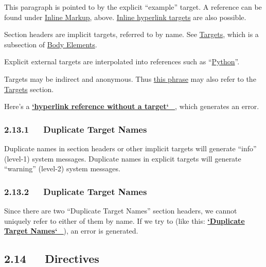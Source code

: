 \documentclass[a4paper]{article}
\begin{document}
\label{example}
This paragraph is pointed to by the explicit “example” target. A
reference can be found under \hyperref[inline-markup]{Inline Markup}, above. \hyperref[inline-hyperlink-targets]{Inline
hyperlink targets} are also possible.

Section headers are implicit targets, referred to by name. See
\hyperref[another-target]{Targets}, which is a subsection of \hyperref[body-elements]{Body Elements}.

Explicit external targets are interpolated into references such as
“\href{http://www.python.org/}{Python}”.

Targets may be indirect and anonymous.  Thus \hyperref[another-target]{this phrase} may also
refer to the \hyperref[another-target]{Targets} section.

Here’s a %
\hyperlink{system-message-4}{\textbf{\color{red}`hyperlink reference without a target`\_}}, which generates an
error.


\subsubsection{2.13.1   Duplicate Target Names%
  \label{duplicate-target-names-1}%
}

Duplicate names in section headers or other implicit targets will
generate “info” (level-1) system messages.  Duplicate names in
explicit targets will generate “warning” (level-2) system messages.


\subsubsection{2.13.2   Duplicate Target Names%
  \label{duplicate-target-names-2}%
}

Since there are two “Duplicate Target Names” section headers, we
cannot uniquely refer to either of them by name.  If we try to (like
this: %
\hyperlink{system-message-5}{\textbf{\color{red}`Duplicate Target Names`\_}}), an error is generated.


\subsection{2.14   Directives%
  \label{directives}%
}

\label{contents}
\end{document}
